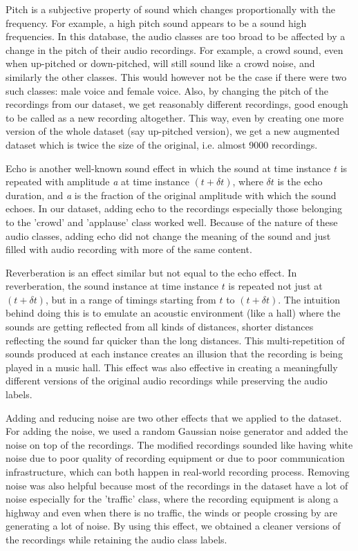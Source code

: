 Pitch is a subjective property of sound which changes proportionally with the frequency. For example, a high pitch sound appears to be a sound high frequencies. In this database, the audio classes are too broad to be affected by a change in the pitch of their audio recordings. For example, a crowd sound, even when up-pitched or down-pitched, will still sound like a crowd noise, and similarly the other classes. This would however not be the case if there were two such classes: male voice and female voice. Also, by changing the pitch of the recordings from our dataset, we get reasonably different recordings, good enough to be called as a new recording altogether. This way, even by creating one more version of the whole dataset (say up-pitched version), we get a new augmented dataset which is twice the size of the original, i.e. almost 9000 recordings.

Echo is another well-known sound effect in which the sound at time instance $t$ is repeated with amplitude \textsl{a} at time instance $(t + \delta t)$, where $\delta t$ is the echo duration, and \textsl{a} is the fraction of the original amplitude with which the sound echoes. In our dataset, adding echo to the recordings especially those belonging to the 'crowd' and 'applause' class worked well. Because of the nature of these audio classes, adding echo did not change the meaning of the sound and just filled with audio recording with more of the same content.

Reverberation is an effect similar but not equal to the echo effect. In reverberation, the sound instance at time instance $t$ is repeated not just at $(t + \delta t)$, but in a range of timings starting from $t$ to $(t + \delta t)$. The intuition behind doing this is to emulate an acoustic environment (like a hall) where the sounds are getting reflected from all kinds of distances, shorter distances reflecting the sound far quicker than the long distances. This multi-repetition of sounds produced at each instance creates an illusion that the recording is being played in a music hall. This effect was also effective in creating a meaningfully different versions of the original audio recordings while preserving the audio labels.

Adding and reducing noise are two other effects that we applied to the dataset. For adding the noise, we used a random Gaussian noise generator and added the noise on top of the recordings. The modified recordings sounded like having white noise due to poor quality of recording equipment or due to poor communication infrastructure, which can both happen in real-world recording process. Removing noise was also helpful because most of the recordings in the dataset have a lot of noise especially for the 'traffic' class, where the recording equipment is along a highway and even when there is no traffic, the winds or people crossing by are generating a lot of noise. By using this effect, we obtained a cleaner versions of the recordings while retaining the audio class labels.

